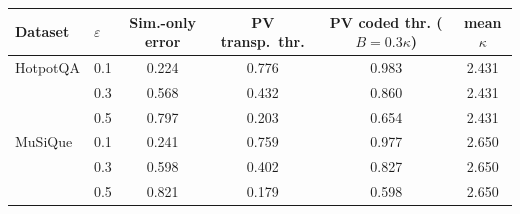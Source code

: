 \begin{tabular}{llcccc}
\toprule
Dataset & $\varepsilon$ & Sim.-only error & PV transp.~thr. & PV coded thr. ($B{=}0.3\kappa$) & mean $\kappa$ \\
\midrule
HotpotQA & 0.1 & 0.224 & 0.776 & 0.983 & 2.431 \\
 & 0.3 & 0.568 & 0.432 & 0.860 & 2.431 \\
 & 0.5 & 0.797 & 0.203 & 0.654 & 2.431 \\
\midrule
MuSiQue & 0.1 & 0.241 & 0.759 & 0.977 & 2.650 \\
 & 0.3 & 0.598 & 0.402 & 0.827 & 2.650 \\
 & 0.5 & 0.821 & 0.179 & 0.598 & 2.650 \\
\bottomrule
\end{tabular}